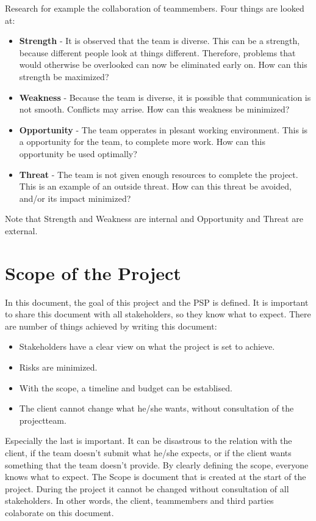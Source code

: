 \documentclass[10pt]{report}
\begin{document}
Research for example the collaboration of teammembers. Four things are looked at:

\begin{itemize}
	\item \textbf{Strength} - It is observed that the team is diverse. This can be a strength, because different people look at things different. Therefore, problems that would otherwise be overlooked can now be eliminated early on. How can this strength be maximized?
	\item \textbf{Weakness} - Because the team is diverse, it is possible that communication is not smooth. Conflicts may arrise. How can this weakness be minimized?
	\item \textbf{Opportunity} - The team opperates in plesant working environment. This is a opportunity for the team, to complete more work. How can this opportunity be used optimally?
	\item \textbf{Threat} - The team is not given enough resources to complete the project. This is an example of an outside threat. How can this threat be avoided, and/or its impact minimized?
\end{itemize}

Note that Strength and Weakness are internal and Opportunity and Threat are external.

\newpage

\section{Scope of the Project}

In this document, the goal of this project and the PSP is defined. It is important to share this document with all stakeholders, so they know what to expect. There are number of things achieved by writing this document:

\begin{itemize}
	\item Stakeholders have a clear view on what the project is set to achieve.
	\item Risks are minimized.
	\item With the scope, a timeline and budget can be establised.
	\item The client cannot change what he/she wants, without consultation of the projectteam.
\end{itemize}

Especially the last is important. It can be disastrous to the relation with the client, if the team doesn't submit what he/she expects, or if the client wants something that the team doesn't provide. By clearly defining the scope, everyone knows what to expect. The Scope is document that is created at the start of the project. During the project it cannot be changed without consultation of all stakeholders. In other words, the client, teammembers and third parties colaborate on this document.	
\end{document}
